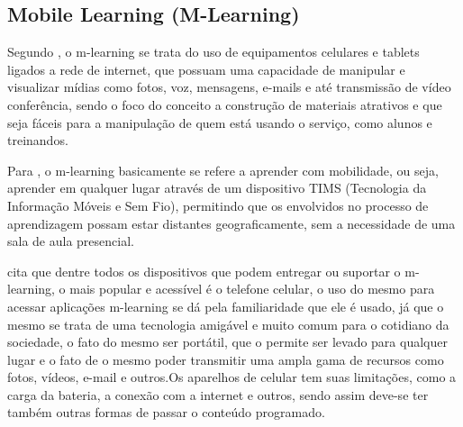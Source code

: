 		\subsection{Mobile Learning (M-Learning)}
 		Segundo , o m-learning se trata do uso de equipamentos  celulares e tablets ligados a rede de internet, que possuam uma capacidade de manipular e visualizar mídias como fotos, voz, mensagens, e-mails e até transmissão de vídeo conferência, sendo o foco do conceito a construção de materiais atrativos e  que seja fáceis para a manipulação de quem está usando o serviço, como alunos e  treinandos.
 		
 		Para , o m-learning basicamente se refere a aprender com mobilidade, ou seja, aprender em qualquer lugar através de um dispositivo TIMS (Tecnologia da Informação Móveis e Sem Fio), permitindo que os envolvidos no processo de aprendizagem possam estar distantes geograficamente, sem a necessidade de uma sala de aula presencial.
 		
 		 cita que dentre todos os dispositivos que podem entregar ou suportar o m-learning, o mais popular e acessível é o telefone celular, o uso do mesmo para acessar aplicações m-learning se dá pela familiaridade que ele é usado, já que o mesmo se trata de uma tecnologia amigável e muito comum para o cotidiano da sociedade, o fato do mesmo ser portátil, que o permite ser levado para qualquer lugar e o fato de o mesmo poder transmitir uma ampla gama de recursos como fotos, vídeos, e-mail e outros.Os aparelhos de celular tem suas limitações, como a carga da bateria, a conexão com a internet e outros, sendo assim deve-se ter também outras formas de passar o conteúdo programado.
 		
